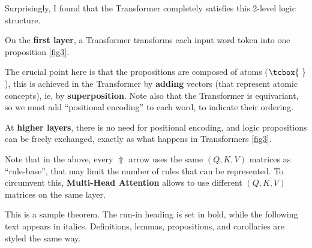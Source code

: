 \documentclass[runningheads]{llncs}
\newcommand{\atom}{\vcenter{\hbox{\tcbox{\mbox{     }}}}}
\begin{document}
Surprisingly, I found that the Transformer completely satisfies this 2-level logic structure.

On the \textbf{first layer}, a Transformer transforms each input word token into one proposition \ref{fig3}.

The crucial point here is that the propositions are composed of atoms ($\atom$), this is achieved in the Transformer by \textbf{adding} vectors (that represent atomic concepts), ie, by \textbf{superposition}.  Note also that the Transformer is equivariant, so we must add ``positional encoding'' to each word, to indicate their ordering.

At \textbf{higher layers}, there is no need for positional encoding, and logic propositions can be freely exchanged, exactly as what happens in Transformers \ref{fig3}.

Note that in the above, every $\Uparrow$ arrow uses the same $(Q,K,V)$ matrices as ``rule-base'', that may limit the number of rules that can be represented.  To circumvent this, \textbf{Multi-Head Attention} allows to use different $(Q,K,V)$ matrices on the same layer.

\begin{theorem}
This is a sample theorem. The run-in heading is set in bold, while
the following text appears in italics. Definitions, lemmas,
propositions, and corollaries are styled the same way.
\end{theorem}
%
%


%
%
%
% 
% 
%
\printbibliography
\end{document}
